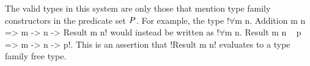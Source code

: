 \documentclass[format=acmsmall,manuscript,screen,nonacm,margin=1in,11pt]{acmart}
\begin{document}
The valid types in this system are only those that mention type family constructors in the predicate set $P$.
For example, the type !$\forall$m n. Addition m n => m -> n -> Result m n! would instead be written
as !$\forall$m n. Result m n ~ p => m -> n -> p!. This is an assertion that !Result m n! evaluates to a
type family free type.


\newcommand\ResNil{
  \ib{\irule[\trule{v-rese}]
    {\ValidCtx \TEnv};
    {\ResTyping \TEnv \empt \empt}
  }
}
\newcommand\ResCons{
  \ib{\irule[\trule{v-resc}]
    {\ValidType \TEnv \sigma}
    {\CoTyping \TEnv \Co {\FamCtrs(\many\tau)\teq\sigma}}
    {\ResTyping \TEnv {\many q} {\many\chi[\alpha/\sigma]}};
    {\ResTyping \TEnv {(\sigma|\Co), \many q} {(\alpha|c\co\FamCtrs(\many\tau)\teq\alpha), \many \chi}}
  }
}

\newcommand\ValidQGndContextAxiom{
  \ib{\irule[\trule{v-qgax}]
    {\substack {\ValidGCtx\GEnv\\
        \fresh \Axiom\GEnv}}
    {\substack {{\many{\ValidType {\GEnv;\many\alpha_i,\TV{\many\chi}} {\tau_{0i}}}}\\
        {\many{\ValidProp{\GEnv;\empt}{\Forall{\many\alpha}{\FamCtrs(\many\tau)\teq\sigma}}}}}}
    {\substack {{\many{\ValidType {\GEnv;\many\alpha_i} {\many\tau_i}}}\\
      {\ValidAssmp {\GEnv;\many\alpha_i} {\many\chi_i}}}}
    {\FamCtrs\co n \in \GEnv};
    {\ValidGCtx{\GEnv,\Axiom\co\many{\Forall{\many\alpha~\many\chi}{\FamCtrs(\many\tau_i)\teq\tau_{0i}}}^{i<k}}}
  }
}
\end{document}
